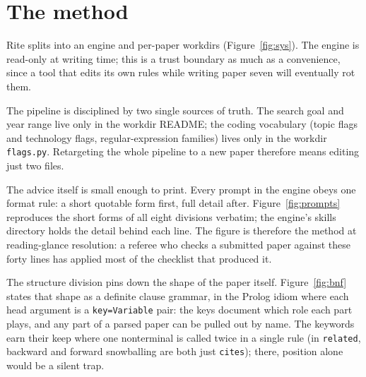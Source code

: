 \section{The method}\label{sec:method}

Rite splits into an engine and per-paper workdirs
(Figure~\ref{fig:sys}).
The engine is read-only at writing time; this is a trust boundary as
much as a convenience, since a tool that edits its own rules while
writing paper seven will eventually rot them.

The pipeline is disciplined by two single sources of truth.
The search goal and year range live only in the workdir README; the
coding vocabulary (topic flags and technology flags,
regular-expression families) lives only in the workdir
\texttt{flags.py}.
Retargeting the whole pipeline to a new paper therefore means editing
just two files.

The advice itself is small enough to print.
Every prompt in the engine obeys one format rule: a short quotable
form first, full detail after.
Figure~\ref{fig:prompts} reproduces the short forms of all eight
divisions verbatim; the engine's skills directory holds the detail
behind each line.
The figure is therefore the method at reading-glance resolution: a
referee who checks a submitted paper against these forty lines has
applied most of the checklist that produced it.

The structure division pins down the shape of the paper itself.
Figure~\ref{fig:bnf} states that shape as a definite clause grammar,
in the Prolog idiom where each head argument is a
\texttt{key=Variable} pair: the keys document which role each part
plays, and any part of a parsed paper can be pulled out by name.
The keywords earn their keep where one nonterminal is called twice in
a single rule (in \texttt{related}, backward and forward snowballing
are both just \texttt{cites}); there, position alone would be a silent
trap.

